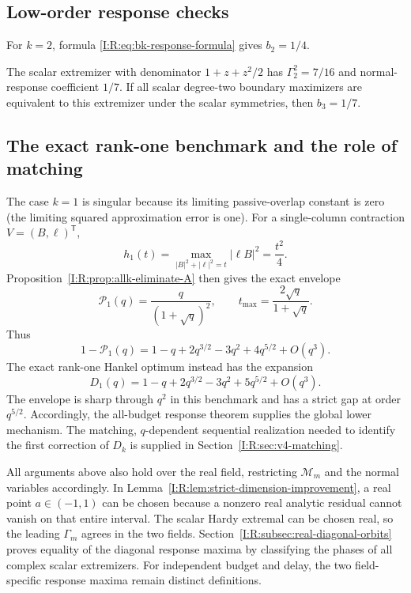 \subsection{Low-order response checks}

\begin{proposition}
\label{I:R:prop:two-state-response-check}
For $k=2$, formula \eqref{I:R:eq:bk-response-formula} gives $b_2=1/4$.
\end{proposition}


\begin{proposition}
\label{I:R:prop:degree-two-response-check}
The scalar extremizer with denominator $1+z+z^2/2$ has
$\Gamma_2^2=7/16$ and normal-response coefficient $1/7$.
If all scalar degree-two boundary maximizers are equivalent to this
extremizer under the scalar symmetries, then $b_3=1/7$.
\end{proposition}


\subsection{The exact rank-one benchmark and the role of matching}

The case $k=1$ is singular because its limiting passive-overlap constant is zero (the limiting squared approximation error is one).
For a single-column contraction $V=(B,\ell)^{\mathsf T}$,
\[
 h_1(t)=\max_{|B|^2+|\ell|^2=t}|\ell B|^2=\frac{t^2}{4}.
\]
Proposition~\ref{I:R:prop:allk-eliminate-A} then gives the exact envelope
\begin{equation}
 \mathcal P_1(q)=\frac{q}{(1+\sqrt q)^2},\qquad
 t_{\max}=\frac{2\sqrt q}{1+\sqrt q}.
 \label{I:R:eq:rankone-envelope-benchmark}
\end{equation}
Thus
\[
 1-\mathcal P_1(q)
 =1-q+2q^{3/2}-3q^2+4q^{5/2}+O(q^3).
\]
The exact rank-one Hankel optimum instead has the expansion
\[
 D_1(q)=1-q+2q^{3/2}-3q^2+5q^{5/2}+O(q^3).
\]
The envelope is sharp through $q^2$ in this benchmark and has a strict
gap at order $q^{5/2}$.  Accordingly, the all-budget response theorem
supplies the global lower mechanism. The matching, $q$-dependent
sequential realization needed to identify the first correction of
$D_k$ is supplied in Section~\ref{I:R:sec:v4-matching}.

All arguments above also hold over the real field, restricting
$\mathcal M_m$ and the normal variables accordingly.  In
Lemma~\ref{I:R:lem:strict-dimension-improvement}, a real point $a\in(-1,1)$
can be chosen because a nonzero real analytic residual cannot vanish
on that entire interval.  The scalar Hardy extremal can be chosen real,
so the leading $\Gamma_m$ agrees in the two fields.
Section~\ref{I:R:subsec:real-diagonal-orbits} proves equality of the
diagonal response maxima by classifying the phases of all complex
scalar extremizers. For independent budget and delay, the two
field-specific response maxima remain distinct definitions.

